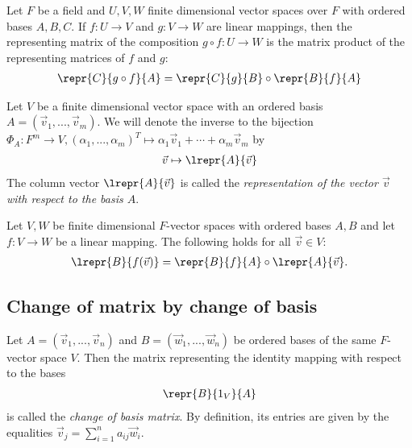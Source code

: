 \documentclass{article}
\begin{document}
\begin{theorem}[Notes 2.3.2]
	Let $F$ be a field and $U,V,W$ finite dimensional vector spaces over $F$ with ordered bases
	$A,B,C$. If $f:U\to V$ and $g:V\to W$ are linear mappings, then the representing matrix of
	the composition $g\circ f:U\to W$ is the matrix product of the representing matrices of
	$f$ and $g$:
	\begin{align*}
		\repr{C}{g\circ f}{A}=\repr{C}{g}{B}\circ\repr{B}{f}{A}
	\end{align*}
\end{theorem}

\begin{definition}
	Let $V$ be a finite dimensional vector space with an ordered basis $A=(\vec v_1,...,\vec v_m)$.
	We will denote the inverse to the bijection $\Phi_A:F^m\to V,(\alpha_1,...,\alpha_m)^T\mapsto \alpha_1\vec v_1+\cdots+\alpha_m\vec v_m$
	by
	\begin{align*}
		\vec v \mapsto \lrepr{A}{\vec v}
	\end{align*}
	The column vector $\lrepr{A}{\vec v}$ is called the \emph{representation of the vector $\vec v$
		with respect to the basis $A$}.
\end{definition}

\begin{theorem}[Notes 2.3.4]
	Let $V,W$ be finite dimensional $F$-vector spaces with ordered bases $A,B$ and let $f:V\to W$
	be a linear mapping. The following holds for all $\vec v\in V$:
	\begin{align*}
		\lrepr{B}{f(\vec v)}=\repr{B}{f}{A} \circ \lrepr{A}{\vec v}.
	\end{align*}
\end{theorem}

\subsection{Change of matrix by change of basis}

\begin{definition}
	Let $A=(\vec v_1, ...,\vec v_n)$ and $B=(\vec w_1,...,\vec w_n)$ be ordered bases of the same
	$F$-vector space $V$. Then the matrix representing the identity mapping with respect to the
	bases
	\begin{align*}
		\repr{B}{1_V}{A}
	\end{align*}
	is called the \emph{change of basis matrix}. By definition, its entries are given by the
	equalities $\vec v_j=\sum_{i=1}^n a_{ij}\vec w_i$.
\end{definition}
\end{document}
